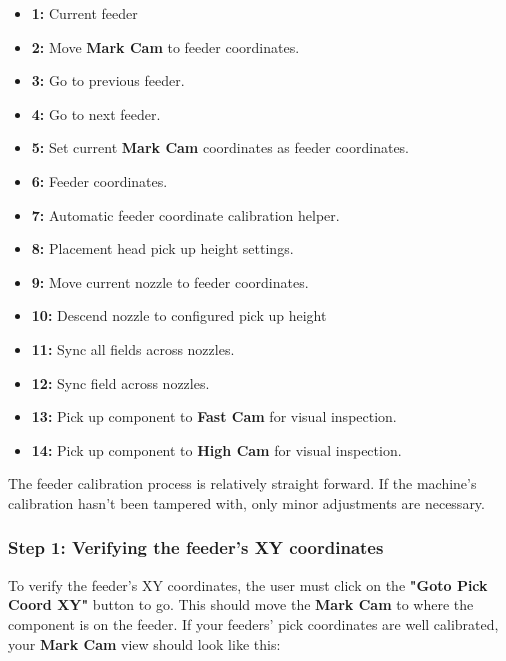 \documentclass[a4paper,10pt]{report}
\begin{document}
\begin{itemize}
 \item \textbf{1: } Current feeder
 \item \textbf{2: } Move \textbf{Mark Cam} to feeder coordinates.
 \item \textbf{3: } Go to previous feeder.
 \item \textbf{4: } Go to next feeder.
 \item \textbf{5: } Set current \textbf{Mark Cam} coordinates as feeder coordinates.
 \item \textbf{6: } Feeder coordinates.
 \item \textbf{7: } Automatic feeder coordinate calibration helper.
 \item \textbf{8: } Placement head pick up height settings.
 \item \textbf{9: } Move current nozzle to feeder coordinates.
 \item \textbf{10: } Descend nozzle to configured pick up height
 \item \textbf{11: } Sync all fields across nozzles.
 \item \textbf{12: } Sync field across nozzles.
 \item \textbf{13: } Pick up component to \textbf{Fast Cam} for visual inspection.
 \item \textbf{14: } Pick up component to \textbf{High Cam} for visual inspection.
\end{itemize}
The feeder calibration process is relatively straight forward. If the machine's calibration hasn't been tampered with, only minor adjustments are necessary.
\newpage
\subsubsection{Step 1: Verifying the feeder's XY coordinates}
 To verify the feeder's XY coordinates, the user must click on the \textbf{"Goto Pick Coord XY"} button to go. This should move the \textbf{Mark Cam} to where the component is on the feeder.
 If your feeders' pick coordinates are well calibrated, your \textbf{Mark Cam} view should look like this:\\
\end{document}
